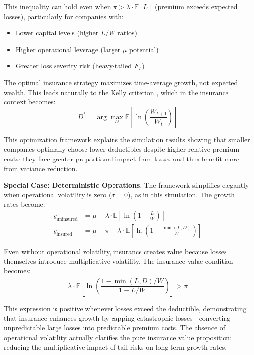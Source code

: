 \documentclass[11pt,letterpaper]{article}
\newcommand{\E}{\mathbb{E}}
\begin{document}
This inequality can hold even when $\pi > \lambda \cdot \E[L]$ (premium exceeds expected losses), particularly for companies with:
\begin{itemize}
    \item Lower capital levels (higher $L/W$ ratios)
    \item Higher operational leverage (larger $\mu$ potential)
    \item Greater loss severity risk (heavy-tailed $F_L$)
\end{itemize}

The optimal insurance strategy maximizes time-average growth, not expected wealth. This leads naturally to the Kelly criterion \citep{kelly1956new}, which in the insurance context becomes:
\begin{equation}
D^* = \arg\max_D \E\left[\ln\left(\frac{W_{t+1}}{W_t}\right)\right]
\end{equation}

This optimization framework explains the simulation results showing that smaller companies optimally choose lower deductibles despite higher relative premium costs: they face greater proportional impact from losses and thus benefit more from variance reduction.

\textbf{Special Case: Deterministic Operations.} The framework simplifies elegantly when operational volatility is zero ($\sigma = 0$), as in this simulation. The growth rates become:
\begin{align}
g_{\text{uninsured}} &= \mu - \lambda \cdot \E\left[\ln\left(1 - \frac{L}{W}\right)\right] \\
g_{\text{insured}} &= \mu - \pi - \lambda \cdot \E\left[\ln\left(1 - \frac{\min(L,D)}{W}\right)\right]
\end{align}

Even without operational volatility, insurance creates value because losses themselves introduce multiplicative volatility. The insurance value condition becomes:
\begin{equation}
\lambda \cdot \E\left[\ln\left(\frac{1 - \min(L,D)/W}{1 - L/W}\right)\right] > \pi
\end{equation}

This expression is positive whenever losses exceed the deductible, demonstrating that insurance enhances growth by capping catastrophic losses—converting unpredictable large losses into predictable premium costs. The absence of operational volatility actually clarifies the pure insurance value proposition: reducing the multiplicative impact of tail risks on long-term growth rates.
\end{document}

